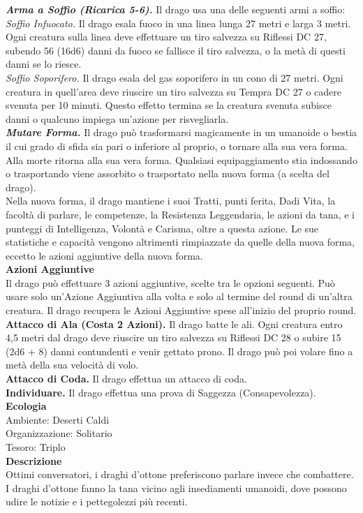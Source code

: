 \begin{multicols}{2}
\emph{\textbf{Arma a Soffio (Ricarica 5-6).}} Il drago usa una delle seguenti armi a soffio:\\
\emph{Soffio Infuocato.} Il drago esala fuoco in una linea lunga 27 metri e larga 3 metri. Ogni creatura sulla linea deve effettuare un tiro salvezza su Riflessi DC  27, subendo 56 (16d6) danni da fuoco se fallisce il tiro salvezza, o la metà di questi danni se lo riesce.\\
\emph{Soffio Soporifero.} Il drago esala del gas soporifero in un cono di 27 metri. Ogni creatura in quell'area deve riuscire un tiro salvezza su Tempra DC  27 o cadere svenuta per 10 minuti. Questo effetto termina se la creatura svenuta subisce danni o qualcuno impiega un'azione per risvegliarla.\\
\emph{\textbf{Mutare Forma.}} Il drago può trasformarsi magicamente in un umanoide o bestia il cui grado di sfida sia pari o inferiore al proprio, o tornare alla sua vera forma. Alla morte ritorna alla sua vera forma. Qualsiasi equipaggiamento stia indossando o trasportando viene assorbito o trasportato nella nuova forma (a scelta del drago). \\
Nella nuova forma, il drago mantiene i suoi Tratti, punti ferita, Dadi Vita, la facoltà di parlare, le competenze, la Resistenza Leggendaria, le azioni da tana, e i punteggi di Intelligenza, Volontà e Carisma, oltre a questa azione. Le sue statistiche e capacità vengono altrimenti rimpiazzate da quelle della nuova forma, eccetto le azioni aggiuntive della nuova forma.\\
\textbf{Azioni Aggiuntive}\\
Il drago può effettuare 3 azioni aggiuntive, scelte tra le opzioni seguenti. Può usare solo un'Azione Aggiuntiva alla volta e solo al termine del round di un'altra creatura. Il drago recupera le Azioni Aggiuntive spese all'inizio del proprio round.\\
\textbf{Attacco di Ala (Costa 2 Azioni).} Il drago batte le ali. Ogni creatura entro 4,5 metri dal drago deve riuscire un tiro salvezza su Riflessi DC  28 o subire 15 (2d6 + 8) danni contundenti e venir gettato prono. Il drago può poi volare fino a metà della sua velocità di volo.\\
\textbf{Attacco di Coda.} Il drago effettua un attacco di coda.\\
\textbf{Individuare.} Il drago effettua una prova di Saggezza (Consapevolezza).\\
\textbf{Ecologia}\\
Ambiente: Deserti Caldi\\
Organizzazione: Solitario\\
Tesoro: Triplo\\
\textbf{Descrizione}\\
Ottimi conversatori, i draghi d'ottone preferiscono parlare invece che combattere. I draghi d'ottone fanno la tana vicino agli insediamenti umanoidi, dove possono udire le notizie e i pettegolezzi più recenti.\\



\end{multicols}
